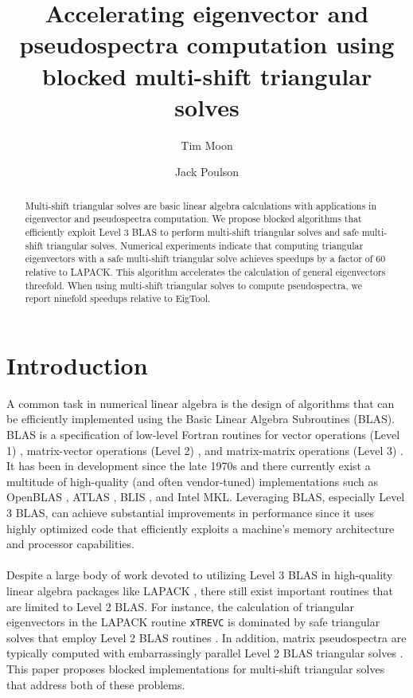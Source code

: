\documentclass{article}
\begin{document}
\title{Accelerating eigenvector and pseudospectra computation using
  blocked multi-shift triangular solves}
\author[1]{Tim Moon}
\author[1,2]{Jack Poulson}
\maketitle

\begin{abstract}
  Multi-shift triangular solves are basic linear algebra calculations
  with applications in eigenvector and pseudospectra computation. We
  propose blocked algorithms that efficiently exploit Level 3 BLAS to
  perform multi-shift triangular solves and safe multi-shift
  triangular solves. Numerical experiments indicate that computing
  triangular eigenvectors with a safe multi-shift triangular solve
  achieves speedups by a factor of 60 relative to LAPACK. This
  algorithm accelerates the calculation of general eigenvectors
  threefold. When using multi-shift triangular solves to compute
  pseudospectra, we report ninefold speedups relative to EigTool.
\end{abstract}

\section{Introduction}
A common task in numerical linear algebra is the design of algorithms
that can be efficiently implemented using the Basic Linear Algebra
Subroutines (BLAS). BLAS is a specification of low-level Fortran
routines for vector operations (Level 1) \cite{lawson1979basic},
matrix-vector operations (Level 2) \cite{dongarra1988extended,
  dongarra1988algorithm}, and matrix-matrix operations (Level 3)
\cite{dongarra1990set, dongarra1990algorithm}. It has been in
development since the late 1970s and there currently exist a multitude
of high-quality (and often vendor-tuned) implementations such as
OpenBLAS \cite{zhang2012model, wang2013augem}, ATLAS
\cite{whaley2005minimizing}, BLIS \cite{van2015blis}, and Intel
MKL. Leveraging BLAS, especially Level 3 BLAS, can achieve substantial
improvements in performance since it uses highly optimized code that
efficiently exploits a machine's memory architecture and processor
capabilities.

\paragraph{}
Despite a large body of work devoted to utilizing Level 3 BLAS in
high-quality linear algebra packages like LAPACK
\cite{anderson1999lapack}, there still exist important routines that
are limited to Level 2 BLAS. For instance, the calculation of
triangular eigenvectors in the LAPACK routine \texttt{xTREVC} is
dominated by safe triangular solves that employ Level 2 BLAS routines
\cite{gates2014accelerating}.  In addition, matrix pseudospectra are
typically computed with embarrassingly parallel Level 2 BLAS
triangular solves \cite{trefethen2005spectra}.  This paper proposes
blocked implementations for multi-shift triangular solves that address
both of these problems.
\end{document}
